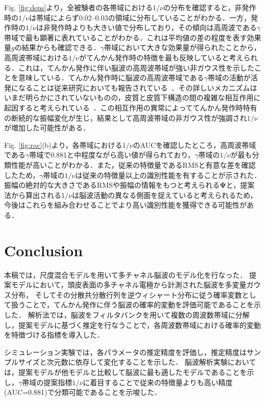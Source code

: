 \documentclass[journal]{IEEEtran}
\begin{document}
Fig. \ref{fig:dens}より，全被験者の各帯域における$1/\nu$の分布を確認すると，非発作時の$1/\nu$は帯域によらず0.02--0.03の領域に分布していることがわかる．一方，発作時の$1/\nu$は非発作時よりも大きい値で分布しており，その傾向は高周波である$\gamma$帯域で最も顕著に表れていることがわかる．これは平均値の差の程度を表す効果量$g$の結果からも確認できる．$\gamma$帯域において大きな効果量が得られたことから，高周波帯域における$1/\nu$がてんかん発作時の特徴を最も反映していると考えられる．これは，てんかん発作に伴い脳波の高周波帯域が強い非ガウス性を示したことを意味している．てんかん発作時に脳波の高周波帯域である$\gamma$帯域の活動が活発になることは従来研究においても報告されている~\cite{Kobayashi2004,Kobayashi2009,Benedek2016}．その詳しいメカニズムはいまだ明らかにされていないものの，皮質と皮質下構造の間の複雑な相互作用に起因すると考えられている~\cite{Kobayashi2004}．この相互作用の異常によっててんかん発作時特有の断続的な振幅変化が生じ，結果として高周波帯域の非ガウス性が強調され$1/\nu$が増加した可能性がある．

Fig. \ref{fig:roc}(b)より，各帯域における$1/\nu$のAUCを確認したところ，高周波帯域である$\gamma$帯域で0.881と中程度ながら高い値が得られており，$\gamma$帯域の$1/\nu$が最も分類性能が高いことがわかる．また，従来の特徴量であるRMSと有意な差を確認したため，$\gamma$帯域の$1/\nu$は従来の特徴量以上の識別性能を有することが示された．振幅の絶対的な大きさであるRMSや振幅の情報をもつと考えられる$\mathbf{\Psi}$と，提案法から算出される$1/\nu$は脳波活動の異なる側面を捉えていると考えられるため，今後はこれらを組み合わせることでより高い識別性能を獲得できる可能性がある．

\section{Conclusion}
本稿では，尺度混合モデルを用いて多チャネル脳波のモデル化を行なった．
提案モデルにおいて，頭皮表面の多チャネル電極から計測された脳波を多変量ガウス分布，
そしてその分散共分散行列を逆ウィシャート分布に従う確率変数として扱うことで，てんかん発作に伴う脳波の確率的変動を評価可能であることを示した．
解析法では，脳波をフィルタバンクを用いて複数の周波数帯域に分解し，提案モデルに基づく推定を行なうことで，各周波数帯域における確率的変動を特徴づける指標を導入した．

シミュレーション実験では，各パラメータの推定精度を評価し，推定精度はサンプルサイズと次元数に依存して変化することを示した．
脳波解析実験においては，提案モデルが他モデルと比較して脳波に最も適したモデルであることを示し，$\gamma$帯域の提案指標$1/\nu$に着目することで従来の特徴量よりも高い精度(AUC=0.881)で分類可能であることを示唆した．
\end{document}
